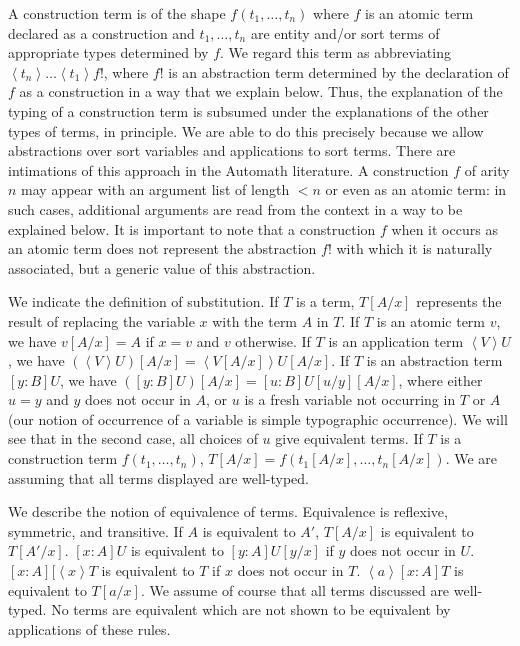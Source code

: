 \documentclass{article}
\begin{document}
A construction term is of the shape $f(t_1,\ldots,t_n)$ where $f$ is an atomic term declared as a construction and $t_1,\ldots,t_n$ are entity and/or sort terms of appropriate types determined by $f$.  We regard this term as abbreviating $\left<t_n\right>\ldots\left<t_1\right>f!$, where $f!$ is an abstraction term determined by the declaration of $f$ as a construction in a way that we explain below.  Thus, the explanation of the typing of a construction term is subsumed under the explanations of the other types of terms, in principle.  We are able to do this precisely because we allow abstractions over sort variables and applications to sort terms.  There are intimations of this approach in the Automath literature.  A construction $f$ of arity $n$ may appear with an argument list of length $<n$ or even as an atomic term:  in such cases, additional arguments are read from the context in a way to be explained below.  It is important to note that a construction $f$ when it occurs as an atomic term does not represent the abstraction $f!$ with which it is naturally associated, but a generic value of this abstraction.

We indicate the definition of substitution.  If $T$ is a term, $T[A/x]$ represents the result of replacing the variable $x$ with the term $A$ in $T$.  If $T$ is an atomic term $v$, we have $v[A/x]=A$ if $x=v$ and $v$ otherwise.  If $T$ is an application term $\left<V\right>U$, we have $(\left<V\right>U)[A/x] = \left<V[A/x]\right>U[A/x]$.  If $T$ is an abstraction term $[y:B]U$, we have $([y:B]U)[A/x]=[u:B]U[u/y][A/x]$, where either $u=y$ and
$y$ does not occur in $A$, or $u$ is a fresh variable not occurring in $T$ or $A$ (our notion of occurrence of a variable is simple typographic occurrence).
We will see that in the second case, all choices of $u$ give equivalent terms.  If $T$ is a construction term $f(t_1,\ldots,t_n)$, $T[A/x] = f(t_1[A/x],\ldots,t_n[A/x])$.  We are assuming that all terms displayed are well-typed.

We describe the notion of equivalence of terms.  Equivalence is reflexive, symmetric, and transitive.  If $A$ is equivalent to $A'$, $T[A/x]$ is equivalent to $T[A'/x]$.  $[x:A]U$ is equivalent to $[y:A]U[y/x]$ if $y$ does not occur in $U$.  $[x:A][\left<x\right>T$ is equivalent to $T$ if $x$ does not occur in $T$.
$\left<a\right>[x:A]T$ is equivalent to $T[a/x]$.  We assume of course that all terms discussed are well-typed.  No terms are equivalent which are not shown to be equivalent by applications of these rules.
\end{document}
